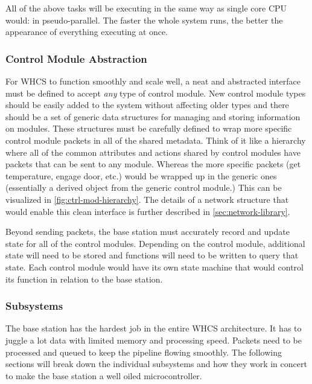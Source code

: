 All of the above tasks will be executing in the same way as single core CPU
would: in pseudo-parallel. The faster the whole system runs, the better the
appearance of everything executing at once.

\subsubsection{Control Module Abstraction}
For WHCS to function smoothly and scale well, a neat and abstracted interface
must be defined to accept \emph{any} type of control module. New control module
types should be easily added to the system without affecting older types and
there should be a set of generic data structures for managing and storing
information on modules. These structures must be carefully defined to wrap more
specific control module packets in all of the shared metadata. Think of it like
a hierarchy where all of the common attributes and actions shared by control
modules have packets that can be sent to any module. Whereas the more specific
packets (get temperature, engage door, etc.) would be wrapped up in the generic
ones (essentially a derived object from the generic control module.) This can
be visualized in \autoref{fig:ctrl-mod-hierarchy}. The
details of a network structure that would enable this clean interface is
further described in \autoref{sec:network-library}.


Beyond sending packets, the base station must accurately record and update
state for all of the control modules. Depending on the control module,
additional state will need to be stored and functions will need to be written
to query that state. Each control module would have its own state machine that
would control its function in relation to the base station.

%

\subsubsection{Subsystems}
The base station has the hardest job in the entire WHCS architecture. It has to
juggle a lot data with limited memory and processing speed. Packets need to be
processed and queued to keep the pipeline flowing smoothly. The following
sections will break down the individual subsystems and how they work in concert
to make the base station a well oiled microcontroller.

